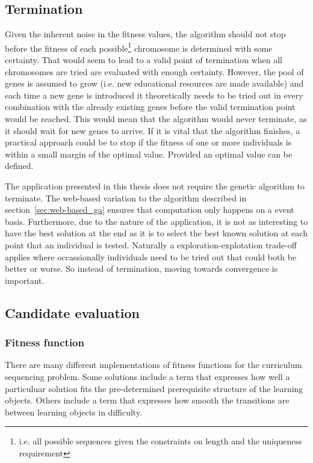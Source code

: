 \subsection{Termination}
Given the inherent noise in the fitness values, the algorithm should not stop
before the fitness of each possible\footnote{i.e. all possible sequences given
the constraints on length and the uniqueness requirement} chromosome is determined
with some certainty. That would seem to lead to a valid point of termination
when all chromosomes are tried are evaluated with enough certainty. However,
the pool of genes is assumed to grow (i.e. new educational resources are made
available) and each time a new gene is introduced it theoretically needs to be
tried out in every combination with the already existing genes before the valid
termination point would be reached. This would mean that the algorithm would
never terminate, as it should wait for new genes to arrive. If it is vital that
the algorithm finishes, a practical approach could be to stop if the fitness of
one or more individuals is within a small margin of the optimal value. Provided
an optimal value can be defined.

The application presented in this thesis does not require the genetic algorithm
to terminate. The web-based variation to the algorithm described in
section~\ref{sec:web-based_ga} ensures that computation only happens on a event
basis. Furthermore, due to the nature of the application, it is not
as interesting to have the best solution at the end as it is to select the best
known solution at each point that an individual is tested. Naturally a
exploration-explotation trade-off applies where occassionally individuals need
to be tried out that could both be better or worse. So instead of termination,
moving towards convergence is important.

\subsection{Candidate evaluation}
\subsubsection{Fitness function}
There are many different implementations of fitness functions for the
curriculum sequencing problem. Some solutions include a term that expresses how
well a particuluar solution fits the pre-determined prerequisite structure of
the learning objects. Others include a term that expresses how smooth the
transitions are between learning objects in difficulty.

